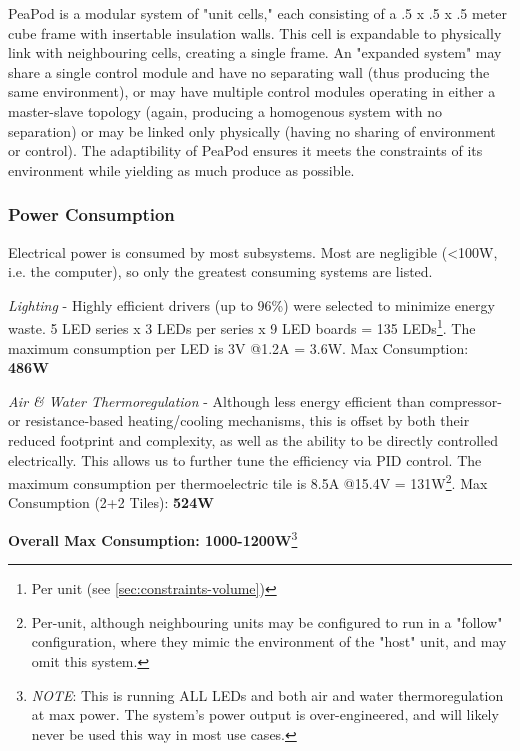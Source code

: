 \documentclass{report}
\begin{document}
PeaPod is a modular system of "unit cells," each consisting of a .5 x .5 x .5 meter cube frame with insertable insulation walls. This cell is expandable to physically link with neighbouring cells, creating a single frame. An "expanded system" may share a single control module and have no separating wall (thus producing the same environment), or may have multiple control modules operating in either a master-slave topology (again, producing a homogenous system with no separation) or may be linked only physically (having no sharing of environment or control). The adaptibility of PeaPod ensures it meets the constraints of its environment while yielding as much produce as possible.


\subsubsection{Power Consumption} 
\label{sec:constraints-power}



Electrical power is consumed by most subsystems. Most are negligible (<100W, i.e. the computer), so only the greatest consuming systems are listed.

\textit{Lighting} - Highly efficient drivers (up to 96\%) were selected to minimize energy waste. 5 LED series x 3 LEDs per series x 9 LED boards = 135 LEDs\footnote{Per unit (see \ref{sec:constraints-volume})}. The maximum consumption per LED is 3V @1.2A = 3.6W. Max Consumption: \textbf{486W}\footnotemark[1]

\textit{Air \& Water Thermoregulation} - Although less energy efficient than compressor- or resistance-based heating/cooling mechanisms, this is offset by both their reduced footprint and complexity, as well as the ability to be directly controlled electrically. This allows us to further tune the efficiency via PID control. The maximum consumption per thermoelectric tile is 8.5A @15.4V = 131W\footnote{Per-unit, although neighbouring units may be configured to run in a "follow" configuration, where they mimic the environment of the "host" unit, and may omit this system.}. Max Consumption (2+2 Tiles\footnotemark[1]): \textbf{524W}

\textbf{Overall Max Consumption: 1000-1200W}\footnote{\textit{NOTE}: This is running ALL LEDs and both air and water thermoregulation at max power. The system's power output is over-engineered, and will likely never be used this way in most use cases.}
\newpage
\end{document}
